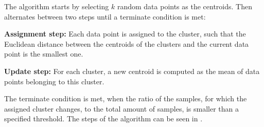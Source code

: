 The algorithm starts by selecting $k$ random data points as the centroids. Then alternates between two steps until a terminate condition is met:
\begin{description}
    \item{\textbf{Assignment step:}} Each data point is assigned to the cluster, such that the Euclidean distance between the centroids of the clusters and the current data point is the smallest one.
    \item{\textbf{Update step:}} For each cluster, a new centroid is computed as the mean of data points belonging to this cluster.
\end{description}

The terminate condition is met, when the ratio of the samples, for which the assigned cluster changes, to the total amount of samples, is smaller than a specified threshold. The steps of the algorithm can be seen in .
